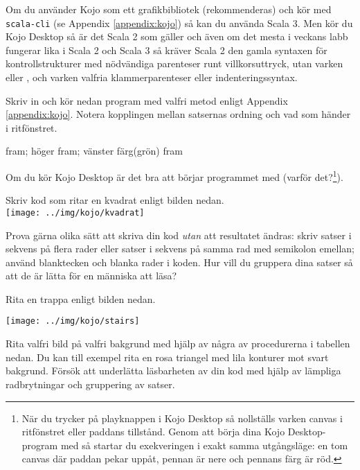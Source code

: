Om du använder Kojo som ett grafikbibliotek (rekommenderas) och kör med \texttt{scala-cli} (se Appendix \ref{appendix:kojo}) så kan du använda Scala 3. Men kör du Kojo Desktop så är det Scala 2 som gäller och även om det mesta i veckans labb fungerar lika i Scala 2 och Scala 3 så kräver Scala 2 den gamla syntaxen för kontrollstrukturer med nödvändiga parenteser runt villkorsuttryck, utan varken  eller , och varken valfria klammerparenteser eller indenteringssyntax. 

Skriv in och kör nedan program med valfri metod enligt Appendix \ref{appendix:kojo}. Notera kopplingen mellan satsernas ordning och vad som händer i ritfönstret.

\begin{Code}
fram; höger
fram; vänster
färg(grön)
fram
\end{Code}
\noindent Om du kör Kojo Desktop är det bra att börjar programmet med  (varför det?\footnote{När du trycker på playknappen i Kojo Desktop så nollställs varken canvas i ritfönstret eller paddans tillstånd. Genom att börja dina Kojo Desktop-program med  så startar du exekveringen i exakt samma utgångsläge: en tom canvas där paddan pekar uppåt, pennan är nere och pennans färg är röd.}).

\Subtask Skriv kod som ritar en kvadrat enligt bilden nedan.
\vspace{1em}\\\texttt{[image: ../img/kojo/kvadrat]}

\noindent Prova gärna olika sätt att skriva din kod \emph{utan} att resultatet ändras: skriv satser i sekvens på flera rader eller satser i sekvens på samma rad med semikolon emellan; använd blanktecken och blanka rader i koden. Hur vill du gruppera dina satser så att de är lätta för en människa att läsa?


\Subtask Rita en trappa enligt bilden nedan.

\texttt{[image: ../img/kojo/stairs]}

\Subtask Rita valfri bild på valfri bakgrund med hjälp av några av procedurerna i tabellen nedan. Du kan till exempel rita en rosa triangel med lila konturer mot svart bakgrund. %
Försök att underlätta läsbarheten av din kod med hjälp av lämpliga radbrytningar och gruppering av satser.


